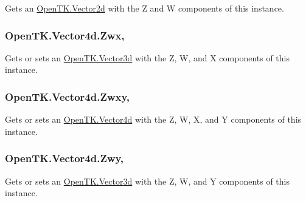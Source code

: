 Gets an \hyperlink{struct_open_t_k_1_1_vector2d}{Open\-T\-K.\-Vector2d} with the Z and W components of this instance. 

\hypertarget{struct_open_t_k_1_1_vector4d_a78309dc07b0dd112b59dbee1127f795c}{
\subsubsection[{Zwx}]{ Open\-T\-K.\-Vector4d.\-Zwx\hspace{0.3cm}{\ttfamily [get]}, {\ttfamily [set]}}}\label{struct_open_t_k_1_1_vector4d_a78309dc07b0dd112b59dbee1127f795c}


Gets or sets an \hyperlink{struct_open_t_k_1_1_vector3d}{Open\-T\-K.\-Vector3d} with the Z, W, and X components of this instance. 

\hypertarget{struct_open_t_k_1_1_vector4d_ac67b4699c19bddbe5f02f876cb5ed8ae}{
\subsubsection[{Zwxy}]{ Open\-T\-K.\-Vector4d.\-Zwxy\hspace{0.3cm}{\ttfamily [get]}, {\ttfamily [set]}}}\label{struct_open_t_k_1_1_vector4d_ac67b4699c19bddbe5f02f876cb5ed8ae}


Gets or sets an \hyperlink{struct_open_t_k_1_1_vector4d}{Open\-T\-K.\-Vector4d} with the Z, W, X, and Y components of this instance. 

\hypertarget{struct_open_t_k_1_1_vector4d_ac126676649f22dcc8fa0167a41450c4f}{
\subsubsection[{Zwy}]{ Open\-T\-K.\-Vector4d.\-Zwy\hspace{0.3cm}{\ttfamily [get]}, {\ttfamily [set]}}}\label{struct_open_t_k_1_1_vector4d_ac126676649f22dcc8fa0167a41450c4f}


Gets or sets an \hyperlink{struct_open_t_k_1_1_vector3d}{Open\-T\-K.\-Vector3d} with the Z, W, and Y components of this instance. 

